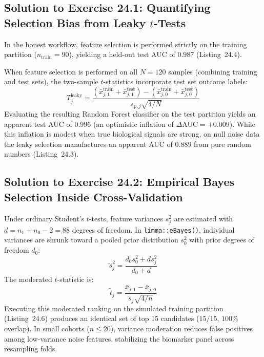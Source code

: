 \documentclass[11pt,twoside,openright]{book}
\begin{document}
\subsection{Solution to Exercise 24.1: Quantifying Selection Bias from Leaky \texorpdfstring{$t$}{t}-Tests}

In the honest workflow, feature selection is performed strictly on the training partition ($n_{\text{train}} = 90$), yielding a held-out test AUC of $0.987$ (Listing~24.4).

When feature selection is performed on all $N = 120$ samples (combining training and test sets), the two-sample $t$-statistics incorporate test set outcome labels:
\begin{equation}
T_j^{\text{leaky}} = \frac{(\bar{x}_{j, 1}^{\text{train}} + \bar{x}_{j, 1}^{\text{test}}) - (\bar{x}_{j, 0}^{\text{train}} + \bar{x}_{j, 0}^{\text{test}})}{s_{p, j} \sqrt{4/N}}
\end{equation}
Evaluating the resulting Random Forest classifier on the test partition yields an apparent test AUC of $0.996$ (an optimistic inflation of $\Delta\text{AUC} = +0.009$). While this inflation is modest when true biological signals are strong, on null noise data the leaky selection manufactures an apparent AUC of $0.889$ from pure random numbers (Listing~24.3).

\subsection{Solution to Exercise 24.2: Empirical Bayes Selection Inside Cross-Validation}

Under ordinary Student's $t$-tests, feature variances $s_j^2$ are estimated with $d = n_1 + n_0 - 2 = 88$ degrees of freedom. In \texttt{limma::eBayes()}, individual variances are shrunk toward a pooled prior distribution $s_0^2$ with prior degrees of freedom $d_0$:
\begin{equation}
\tilde{s}_j^2 = \frac{d_0 s_0^2 + d s_j^2}{d_0 + d}
\end{equation}
The moderated $t$-statistic is:
\begin{equation}
\tilde{t}_j = \frac{\bar{x}_{j, 1} - \bar{x}_{j, 0}}{\tilde{s}_j \sqrt{4/n}}
\end{equation}
Executing this moderated ranking on the simulated training partition (Listing~24.6) produces an identical set of top 15 candidates ($15 / 15$, $100\%$ overlap). In small cohorts ($n \le 20$), variance moderation reduces false positives among low-variance noise features, stabilizing the biomarker panel across resampling folds.
\end{document}
